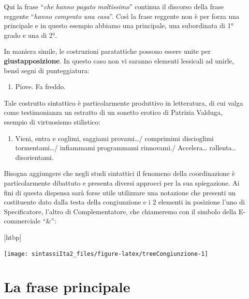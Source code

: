 \documentclass[
  a4paper,
  twoside,
  11pt,
  chapterprefix=false,
  bibliography=totocnumbered,
  listof=flat]{scrbook}
\makeatletter
\providecommand{\tightlist}{%
  \setlength{\itemsep}{0pt}\setlength{\parskip}{0pt}}
\def\fps@figure{htbp}
\renewenvironment{figure}[1][\fps@figure]{
  \edef\@tempa{\noexpand\@float{figure}[#1]} 
  \@tempa
  \sffamily
}{
  \end@float
}
\makeatother
\begin{document}
Qui la frase \enquote{\emph{che hanno pagato moltissimo}} continua il discorso della frase reggente \enquote{\emph{hanno comprato una casa}}.
Così la frase reggente non è per forza una principale e in questo esempio abbiamo una principale, una subordinata di 1° grado e una di 2°.

In maniera simile, le costruzioni paratattiche possono essere unite per \textbf{giustapposizione}. In questo caso non vi saranno elementi lessicali ad unirle, bensì segni di punteggiatura:

\begin{enumerate}
\def\labelenumi{(\arabic{enumi})}
\setcounter{enumi}{21}
\tightlist
\item
  Piove. Fa freddo.
\end{enumerate}

Tale costrutto sintattico è particolarmente produttivo in letteratura, di cui valga come testimonianza un estratto di un sonetto erotico di Patrizia Valduga, esempio di virtuosismo stilistico:

\begin{enumerate}
\def\labelenumi{(\arabic{enumi})}
\setcounter{enumi}{22}
\tightlist
\item
  Vieni, entra e coglimi, saggiami provami\ldots/ comprimimi discioglimi tormentami\ldots/ infiammami programmami rinnovami./ Accelera\ldots{} rallenta\ldots{} disorientami. \citep{valduga1982}
\end{enumerate}

Bisogna aggiungere che negli studi sintattici il fenomeno della coordinazione è particolarmente dibattuto e presenta diversi approcci per la sua spiegazione. Ai fini di questa dispensa sarà forse utile utilizzare una notazione che presenti un costituente dato dalla testa della congiunzione e i 2 elementi in posizione l'uno di Specificatore, l'altro di Complementatore, che chiameremo con il simbolo della E-commerciale \enquote{\&}:

\begin{figure}

{\centering \texttt{[image: sintassiIta2\_files/figure-latex/treeCongiunzione-1]} 

}

\caption{Il costituente di congiunzione}\label{fig:treeCongiunzione}
\end{figure}

\hypertarget{la-frase-principale}{%
\section{La frase principale}\label{la-frase-principale}}
\end{document}
